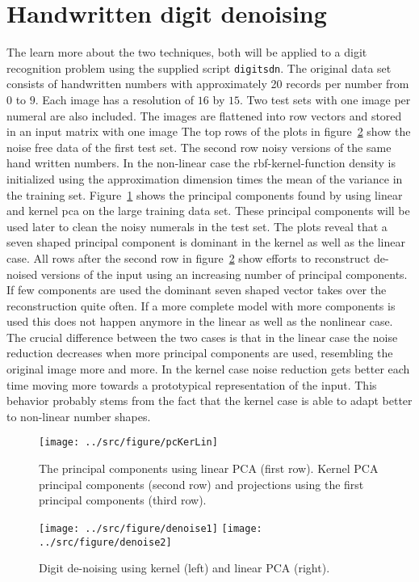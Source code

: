 \section{Handwritten digit denoising}
The learn more about the two techniques, both will be applied to a digit recognition problem using the supplied script \texttt{digitsdn}. The original data set consists of handwritten numbers with approximately 20 records per number from $0$ to $9$. Each image has a resolution of $16$ by $15$. Two test sets with one image per numeral are also included. The images are flattened into row vectors and stored in an input matrix with one image The top rows of the plots in figure~\ref{fig:denoise2} show the noise free data of the first test set. The second row noisy versions of the same hand written numbers. 
In the non-linear case the rbf-kernel-function density is initialized using the approximation dimension times the mean of the variance in the training set. Figure~\ref{fig:pcKerLin} shows the principal components found by using linear and kernel pca on the large training data set. These principal components will be used later to clean the noisy numerals in the test set. The plots reveal that a seven shaped principal component is dominant in the kernel as well as the linear case. All rows after the second row in figure~\ref{fig:denoise2} show efforts to reconstruct de-noised versions of the input using an increasing number of principal components. If few components are used the dominant seven shaped vector takes over the reconstruction quite often. If a more complete model with more components is used this does not happen anymore in the linear as well as the nonlinear case. The crucial difference between the two cases is that in the linear case the noise reduction decreases when more principal components are used, resembling the original image more and more. In the kernel case noise reduction gets better each time moving more towards a prototypical representation of the input. This behavior probably stems from the fact that the kernel case is able to adapt better to non-linear number shapes. 
\begin{figure}
\centering
\texttt{[image: ../src/figure/pcKerLin]}
\caption{The principal components using linear PCA (first row). Kernel PCA principal components (second row) and projections using the first principal components (third row).}
\label{fig:pcKerLin}
\end{figure}
\begin{figure}
\centering
\texttt{[image: ../src/figure/denoise1]}
\texttt{[image: ../src/figure/denoise2]}
\caption{Digit de-noising using kernel (left) and linear PCA (right).}
\label{fig:denoise2}
\end{figure}

